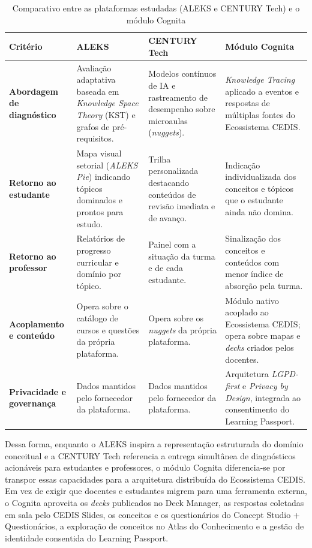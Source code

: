 \begin{table}[htb]
\caption{Comparativo entre as plataformas estudadas (ALEKS e CENTURY Tech) e o módulo Cognita}
\label{tab:comparativo-alternativas}
\centering
\begin{tabularx}{\textwidth}{>{\raggedright\arraybackslash}p{3.0cm}>{\raggedright\arraybackslash}X>{\raggedright\arraybackslash}X>{\raggedright\arraybackslash}X}
\hline
\textbf{Critério} & \textbf{ALEKS} & \textbf{CENTURY Tech} & \textbf{Módulo Cognita} \\
\hline
\textbf{Abordagem de diagnóstico} & Avaliação adaptativa baseada em \textit{Knowledge Space Theory} (KST) e grafos de pré-requisitos. & Modelos contínuos de IA e rastreamento de desempenho sobre microaulas (\textit{nuggets}). & \textit{Knowledge Tracing} aplicado a eventos e respostas de múltiplas fontes do Ecossistema CEDIS. \\
\hline
\textbf{Retorno ao estudante} & Mapa visual setorial (\textit{ALEKS Pie}) indicando tópicos dominados e prontos para estudo. & Trilha personalizada destacando conteúdos de revisão imediata e de avanço. & Indicação individualizada dos conceitos e tópicos que o estudante ainda não domina. \\
\hline
\textbf{Retorno ao professor} & Relatórios de progresso curricular e domínio por tópico. & Painel com a situação da turma e de cada estudante. & Sinalização dos conceitos e conteúdos com menor índice de absorção pela turma. \\
\hline
\textbf{Acoplamento e conteúdo} & Opera sobre o catálogo de cursos e questões da própria plataforma. & Opera sobre os \textit{nuggets} da própria plataforma. & Módulo nativo acoplado ao Ecossistema CEDIS; opera sobre mapas e \textit{decks} criados pelos docentes. \\
\hline
\textbf{Privacidade e governança} & Dados mantidos pelo fornecedor da plataforma. & Dados mantidos pelo fornecedor da plataforma. & Arquitetura \textit{LGPD-first} e \textit{Privacy by Design}, integrada ao consentimento do Learning Passport. \\
\hline
\end{tabularx}
\end{table}

Dessa forma, enquanto o ALEKS inspira a representação estruturada do domínio conceitual e a CENTURY Tech referencia a entrega simultânea de diagnósticos acionáveis para estudantes e professores, o módulo Cognita diferencia-se por transpor essas capacidades para a arquitetura distribuída do Ecossistema CEDIS. Em vez de exigir que docentes e estudantes migrem para uma ferramenta externa, o Cognita aproveita os \textit{decks} publicados no Deck Manager, as respostas coletadas em sala pelo CEDIS Slides, os conceitos e os questionários do Concept Studio + Questionários, a exploração de conceitos no Atlas do Conhecimento e a gestão de identidade consentida do Learning Passport.

